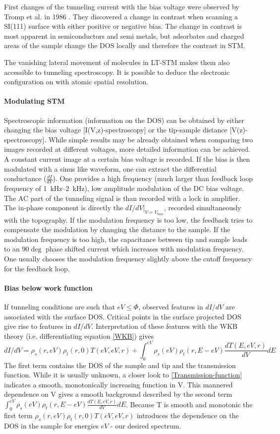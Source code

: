 \label{section:STS}
First changes of the tunneling current with the bias voltage were observed by Tromp et al. in 1986 \cite{tromp_atomic_1986}. They discovered a change in contrast when scanning a SI(111) surface with either positive or negative bias. The change in contrast is most apparent in semiconductors and semi metals\cite{bonnell_scanning_1993}, but adsorbates and charged areas of the sample change the DOS locally and therefore the contrast in STM.

The vanishing lateral movement of molecules in LT-STM makes them also accessible to tunneling spectroscopy. It is possible to deduce the electronic configuration on with atomic spatial resolution.
\paragraph{Modulating STM}
Spectroscopic information (information on the DOS) can be obtained by either changing the bias voltage [I(V,z)-spectroscopy] or the tip-sample distance [V(z)-spectroscopy].
While simple results may be already obtained when comparing two images recorded at different voltages, more detailed information can be achieved. A constant current image at a certain bias voltage is recorded. If the bias is then modulated with a sinus like waveform, one can extract the differential conductance ($\frac{dI}{dV}$). 
One provides a high frequency (much larger than feedback loop frequency of \SIrange{1}{2}{\kilo \hertz}), low amplitude modulation of the DC bias voltage. The AC part of the tunneling signal is than recorded with a lock in amplifier. The in-phase component is directly the $dI/dV|_{V=V_{bias}}$, recorded simultaneously with the topography. If the modulation frequency is too low, the feedback tries to compensate the modulation by changing the distance to the sample.
If the modulation frequency is too high, the capacitance between tip and sample leads to an $90\deg$ phase shifted current which increases with modulation frequency. One usually chooses the modulation frequency slightly above the cutoff frequency for the feedback loop.

\paragraph{Bias below work function}
If tunneling conditions are such that $eV\leq\Phi$, observed features in $dI/dV$ are associated with the surface DOS. Critical points in the surface projected DOS give rise to features in $dI/dV$. Interpretation of these features with the WKB theory (i.e. differentiating equation \eqref{WKB}) gives
$$dI/dV=\rho_s(r,eV)\rho_t(r,0)T(eV,eV,r)+\int_0^{eV}\rho_s(eV)\rho_t(r,E-eV)\frac{dT(E,eV,r)}{dV}dE$$
The first term contains the DOS of the sample and tip and the transmission function. While it is usually unknown, a closer look to \eqref{Transmission-function} indicates a smooth, monotonically increasing function in V. This mannered dependence on V gives a smooth background described by the second term $\int_0^{eV}\rho_s(eV)\rho_t(r,E-eV)\frac{dT(E,eV,r)}{dV}dE$.
Because T is smooth and monotonic the first term $\rho_s(r,eV)\rho_t(r,0)T(eV,eV,r)$ introduces the dependence on the DOS in the sample for energies $eV$ - our desired spectrum.

